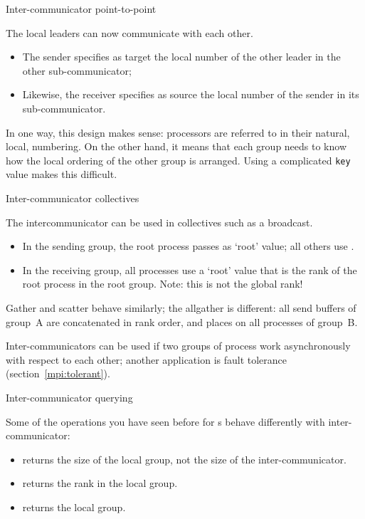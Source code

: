  {Inter-communicator point-to-point}

The local leaders can now communicate with each other.
\begin{itemize}
\item The sender specifies as target the local number of the other
  leader in the other sub-communicator;
\item Likewise, the receiver specifies as source the local number of
  the sender in its sub-communicator.
\end{itemize}
In one way, this design makes sense: processors are referred to in
their natural, local, numbering.
On the other hand, it means that each group needs to know how the
local ordering of the other group is arranged. Using a complicated
\lstinline{key} value makes this difficult.


 {Inter-communicator collectives}

The intercommunicator can be used in collectives such as
a broadcast.

\begin{itemize}
\item In the sending group, the root process passes  as
  `root' value; all others use .
\item In the receiving group, all processes use a `root' value that is the
  rank of the root process in the root group. Note: this is not the
  global rank!
\end{itemize}
Gather and scatter behave similarly; the allgather is different: all
send buffers of group~A are concatenated in rank order, and places on
all processes of group~B.

Inter-communicators can be used if two groups of process work
asynchronously with respect to each other; another application is
fault tolerance (section~\ref{mpi:tolerant}).


 {Inter-communicator querying}

Some of the operations you have seen before for
s behave differently with inter-communicator:
\begin{itemize}
\item {} returns the size of the local
  group, not the size of the inter-communicator.
\item {} returns the rank in the local
  group.
\item {} returns the local group.
\end{itemize}

